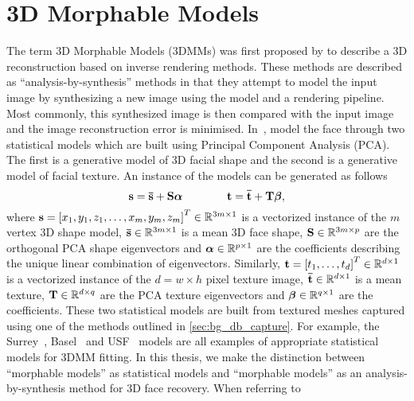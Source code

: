 \section{3D Morphable Models}\label{sec:bg_3dmm}
The term 3D Morphable Models (3DMMs) was first proposed by 
\citet{volker1999morphable} to describe a 3D reconstruction based on inverse
rendering methods. These methods are described as ``analysis-by-synthesis''
methods in that they attempt to model the input image by synthesizing a new
image using the model and a rendering pipeline. Most commonly, this synthesized
image is then compared with the input image and the image reconstruction error
is minimised. In~\cite{volker1999morphable}, 
model the face through two statistical models which are built using 
Principal Component Analysis (PCA). The first is a generative model of 3D
facial shape and the second is a generative model of facial texture.
An instance of the models can be generated as follows
\begin{equation}\label{eg:bg_3dmm_pca}
	\boldsymbol{\mathbf{s}} = \boldsymbol{\mathbf{\bar{s}}} + \boldsymbol{\mathbf{S}} \boldsymbol{\mathbf{\alpha}} \qquad \qquad \boldsymbol{\mathbf{t}} = \boldsymbol{\mathbf{\bar{t}}} + \boldsymbol{\mathbf{T}} \boldsymbol{\mathbf{\beta}},
\end{equation}
where
$\boldsymbol{\mathbf{s}} = {[x_1, y_1, z_1, \ldots, x_m, y_m, z_m]}^T \in \mathbb{R}^{3m \times 1}$ is 
a vectorized instance of the $m$ vertex 3D shape model,
$\boldsymbol{\mathbf{\bar{s}}} \in \mathbb{R}^{3m \times 1}$ is a mean 3D face shape,
$\boldsymbol{\mathbf{S}} \in \mathbb{R}^{3m \times p}$ are the orthogonal PCA shape eigenvectors and 
$\boldsymbol{\mathbf{\alpha}} \in \mathbb{R}^{p \times 1}$ are the coefficients describing the unique
linear combination of eigenvectors. Similarly, 
$\boldsymbol{\mathbf{t}} = {[t_1, \ldots, t_d]}^T \in \mathbb{R}^{d \times 1}$ is 
a vectorized instance of the $d = w \times h$ pixel texture image,
$\boldsymbol{\mathbf{\bar{t}}} \in \mathbb{R}^{d \times 1}$ is a mean texture,
$\boldsymbol{\mathbf{T}} \in \mathbb{R}^{d \times q}$ are the PCA texture eigenvectors and 
$\boldsymbol{\mathbf{\beta}} \in \mathbb{R}^{q \times 1}$ are the coefficients.
These two statistical models are built from textured meshes captured using
one of the methods outlined in \cref{sec:bg_db_capture}. For example,
the Surrey~\cite{Huber:F5Dca9zy}, Basel~\cite{paysan20093d} and 
USF~\cite{volker1999morphable} models are all examples of appropriate
statistical models for 3DMM fitting.
In this thesis, we make the distinction between 
``morphable models'' as statistical models and ``morphable models'' as an
analysis-by-synthesis method for 3D face recovery. When referring to 
